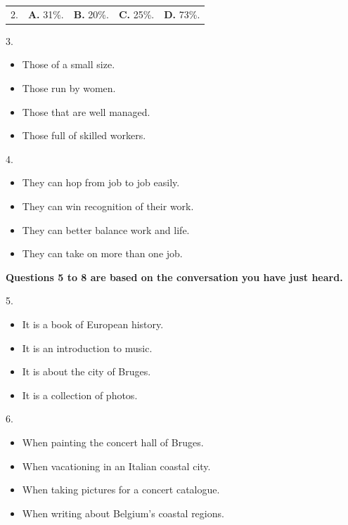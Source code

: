 \documentclass[UTF8,11pt]{ctexart}
\begin{document}
\noindent\begin{tabularx}{\linewidth}{@{}lXXXX@{}}2. & \textbf{A.} 31\%. & \textbf{B.} 20\%. & \textbf{C.} 25\%. & \textbf{D.} 73\%.\\\end{tabularx}\par

3.


\begin{itemize}[leftmargin=2em,itemsep=.2em,topsep=.4em]\item[A.] Those of a small size.
\item[B.] Those run by women.
\item[C.] Those that are well managed.
\item[D.] Those full of skilled workers.
\end{itemize}

4.


\begin{itemize}[leftmargin=2em,itemsep=.2em,topsep=.4em]\item[A.] They can hop from job to job easily.
\item[B.] They can win recognition of their work.
\item[C.] They can better balance work and life.
\item[D.] They can take on more than one job.
\end{itemize}

\textbf{Questions 5 to 8 are based on the conversation you have just heard.}


5.


\begin{itemize}[leftmargin=2em,itemsep=.2em,topsep=.4em]\item[A.] It is a book of European history.
\item[B.] It is an introduction to music.
\item[C.] It is about the city of Bruges.
\item[D.] It is a collection of photos.
\end{itemize}

6.


\begin{itemize}[leftmargin=2em,itemsep=.2em,topsep=.4em]\item[A.] When painting the concert hall of Bruges.
\item[B.] When vacationing in an Italian coastal city.
\item[C.] When taking pictures for a concert catalogue.
\item[D.] When writing about Belgium’s coastal regions.
\end{itemize}
\end{document}
